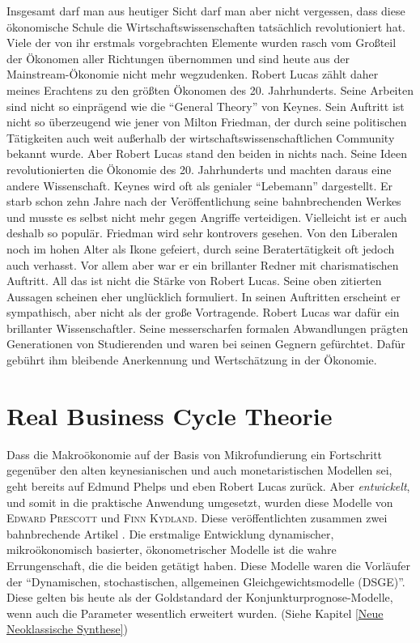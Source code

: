 Insgesamt darf man aus heutiger Sicht darf man aber nicht vergessen, dass diese ökonomische Schule die Wirtschaftswissenschaften tatsächlich revolutioniert hat. Viele der von ihr erstmals vorgebrachten Elemente wurden rasch vom Großteil der Ökonomen aller Richtungen übernommen und sind heute aus der Mainstream-Ökonomie nicht mehr wegzudenken. Robert Lucas zählt daher meines Erachtens zu den größten Ökonomen des 20. Jahrhunderts. Seine Arbeiten sind nicht so einprägend wie die "`General Theory"' von Keynes. Sein Auftritt ist nicht so überzeugend wie jener von Milton Friedman, der durch seine politischen Tätigkeiten auch weit außerhalb der wirtschaftswissenschaftlichen Community bekannt wurde. Aber Robert Lucas stand den beiden in nichts nach. Seine Ideen revolutionierten die Ökonomie des 20. Jahrhunderts und machten daraus eine andere Wissenschaft. Keynes wird oft als genialer "`Lebemann"' dargestellt. Er starb schon zehn Jahre nach der Veröffentlichung seine bahnbrechenden Werkes und musste es selbst nicht mehr gegen Angriffe verteidigen. Vielleicht ist er auch deshalb so populär. Friedman wird sehr kontrovers gesehen. Von den Liberalen noch im hohen Alter als Ikone gefeiert, durch seine Beratertätigkeit oft jedoch auch verhasst. Vor allem aber war er ein brillanter Redner mit charismatischen Auftritt. All das ist nicht die Stärke von Robert Lucas. Seine oben zitierten Aussagen scheinen eher unglücklich formuliert. In seinen Auftritten erscheint er sympathisch, aber nicht als der große Vortragende. Robert Lucas war dafür ein brillanter Wissenschaftler. Seine messerscharfen formalen Abwandlungen prägten Generationen von Studierenden und waren bei seinen Gegnern gefürchtet. Dafür gebührt ihm bleibende Anerkennung und Wertschätzung in der Ökonomie.


\section{Real Business Cycle Theorie}
\label{RBC}
Dass die Makroökonomie auf der Basis von Mikrofundierung ein Fortschritt gegenüber den alten keynesianischen und auch monetaristischen Modellen sei, geht bereits auf Edmund Phelps und eben Robert Lucas zurück. Aber \textit{entwickelt}, und somit in die praktische Anwendung umgesetzt, wurden diese Modelle von \textsc{Edward Prescott} und \textsc{Finn Kydland}. Diese veröffentlichten zusammen zwei bahnbrechende Artikel \parencite{Kydland1977, Kydland1982}. Die erstmalige Entwicklung dynamischer, mikroökonomisch basierter, ökonometrischer Modelle ist die wahre Errungenschaft, die die beiden getätigt haben. Diese Modelle waren die Vorläufer der "`Dynamischen, stochastischen, allgemeinen Gleichgewichtsmodelle (DSGE)"'. Diese gelten bis heute als der Goldstandard der Konjunkturprognose-Modelle, wenn auch die Parameter wesentlich erweitert wurden. (Siehe Kapitel \ref{Neue Neoklassische Synthese})

